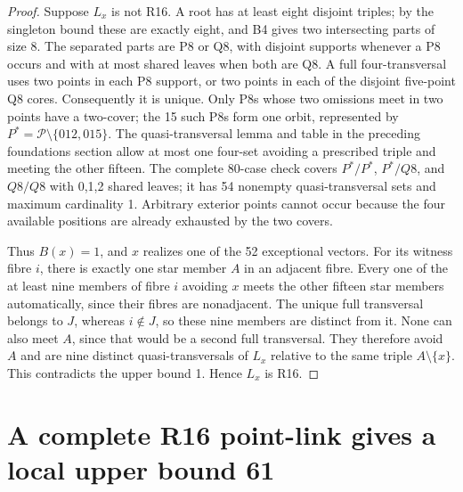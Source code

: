 \documentclass[11pt,a4paper]{article}
\numberwithin{equation}{section}
\theoremstyle{remark}
\newcommand{\Pten}{\mathcal P}
\begin{document}
\begin{proof}
Suppose $ L_x $ is not R16. A root has at least eight disjoint triples;
by the singleton bound these are exactly eight, and B4 gives two
intersecting parts of size 8. The separated parts are P8 or Q8, with
disjoint supports whenever a P8 occurs and with at most shared leaves
when both are Q8. A full four-transversal uses two points in each P8
support, or two points in each of the disjoint five-point Q8 cores.
Consequently it is unique. Only P8s whose two omissions meet in two
points have a two-cover; the 15 such P8s form one orbit, represented
by $ P^*=\Pten\setminus\{012,015\}$. The quasi-transversal lemma and
table in the preceding foundations section allow at most one
four-set avoiding a prescribed triple and meeting the other fifteen.
The complete 80-case check covers $ P^*/P^*$, $ P^*/Q8$, and $ Q8/Q8$ with
0,1,2 shared leaves; it has 54 nonempty quasi-transversal sets and
maximum cardinality 1. Arbitrary exterior points cannot occur because
the four available positions are already exhausted by the two covers.

Thus $ B(x)=1$, and $ x $ realizes one of the 52 exceptional vectors.
For its witness fibre $ i $, there is exactly one star member $ A $ in an
adjacent fibre. Every one of the at least nine members of fibre $ i $
avoiding $ x $ meets the other fifteen star members automatically, since
their fibres are nonadjacent. The unique full transversal belongs to
$ J $, whereas $ i\notin J $, so these nine members are distinct from it.
None can also meet $ A $, since that would be a second full transversal.
They therefore avoid $ A $ and are nine distinct quasi-transversals of
$ L_x $ relative to the same triple $ A\setminus\{x\}$. This contradicts
the upper bound 1. Hence $ L_x $ is R16.
\end{proof}

\section{A complete R16 point-link gives a local upper bound 61}
\label{sec:r61}
\end{document}
